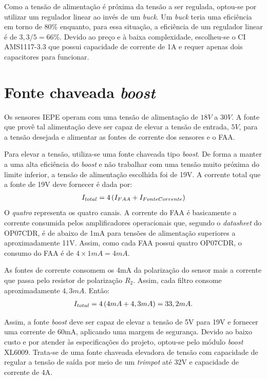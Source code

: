 \documentclass[
	12pt,				%
	openright,			%
	twoside,			%
	a4paper,			%
	english,			%
	french,				%
	spanish,			%
	brazil,				%
	]{abntex2}
\begin{document}
		Como a tensão de alimentação é próxima da tensão a ser regulada,
		optou-se por utilizar um regulador linear ao invés de um
		\textit{buck}. Um \textit{buck} teria uma eficiência em torno de
		80\% enquanto, para essa situação, a eficiência de um regulador
		linear é de $3,3/5 = 66\%$. Devido ao preço e à baixa
		complexidade, escolheu-se o CI AMS1117-3.3 que possui capacidade
		de corrente de 1A e requer apenas dois capacitores para
		funcionar.

	\section{Fonte chaveada \textit{boost}}
		Os sensores IEPE operam com uma tensão de alimentação de $18V$ a
		$30V$. A fonte que provê tal alimentação deve ser capaz de
		elevar a tensão de entrada, $5V$, para a tensão desejada e
		alimentar as fontes de corrente dos sensores e o FAA.
		
		Para elevar a tensão, utiliza-se uma fonte chaveada tipo
		\textit{boost}. De forma a manter a uma alta eficiência do
		\textit{boost} e não trabalhar com uma tensão muito próxima do
		limite inferior, a tensão de alimentação escolhida foi de 19V.
		A corrente total que a fonte de 19V deve fornecer é dada por:
		\begin{gather*}
			I_{total} = 4\* \left(I_{FAA} + I_{FonteCorrente}\right)
		\end{gather*}
		O \textit{quatro} representa os quatro canais. A corrente do FAA
		é basicamente a corrente consumida pelos amplificadores
		operacionais que, segundo o \textit{datasheet} do OP07CDR, é de
		abaixo de 1mA para tensões de alimentação superiores a
		aproximadamente 11V. Assim, como cada FAA possui quatro OP07CDR,
		o consumo do FAA é de $4\times 1mA =  4mA$.

		As fontes de corrente consomem os 4mA da polarização do sensor
		mais a corrente que passa pelo resistor de polarização $R_2$.
		Assim, cada filtro consome aproximadamente $4,3mA$. Então:
		\begin{gather*}
			I_{total} = 4\* \left(4mA + 4,3mA\right) = 33,2mA.
		\end{gather*}

		Assim, a fonte \textit{boost} deve ser capaz de elevar a tensão
		de 5V para 19V e fornecer uma corrente de 60mA, aplicando uma
		margem de segurança. Devido ao baixo custo e por atender às
		especificações do projeto, optou-se pelo módulo \textit{boost}
		XL6009. Trata-se de uma fonte chaveada elevadora de tensão com
		capacidade de regular a tensão de saída por meio de um
		\textit{trimpot} até 32V e capacidade de corrente de 4A.
\end{document}

